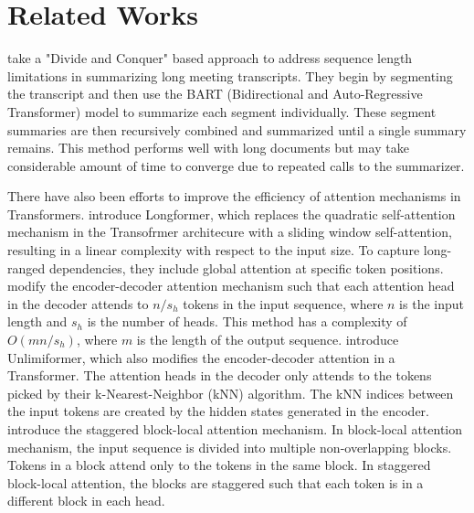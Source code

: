 \section{Related Works}
	\label{sec:related-works}

	\citet{golia2024action} take a "Divide and Conquer" based approach to address
	sequence length limitations in summarizing long meeting transcripts.
	They begin by segmenting the transcript and then use the BART (Bidirectional and
	Auto-Regressive Transformer) model to summarize each segment individually.
	These segment summaries are then recursively combined and summarized until a single
	summary remains.
	This method performs well with long documents but may take considerable amount of time
	to converge due to repeated calls to the summarizer.

	There have also been efforts to improve the efficiency of attention mechanisms in Transformers.
	\citet{beltagy2020longformer} introduce Longformer, which replaces the quadratic
	self-attention mechanism in the Transofrmer architecure with a sliding window self-attention,
	resulting in a linear complexity with respect to the input size.
	To capture long-ranged dependencies, they include global attention at specific token positions.
	\citet{huang-etal-2021-efficient} modify the encoder-decoder attention mechanism such that
	each attention head in the decoder attends to $n/s_h$ tokens in the input sequence, where
	$n$ is the input length and $s_h$ is the number of heads.
	This method has a complexity of $O(mn/s_h)$, where $m$ is the length of the output sequence.
	\citet{bertsch2023unlimiformer} introduce Unlimiformer, which also modifies the encoder-decoder
	attention in a Transformer.
	The attention heads in the decoder only attends to the tokens picked by their
	k-Nearest-Neighbor (kNN) algorithm.
	The kNN indices between the input tokens are created by the hidden states generated in the
	encoder.
	\citet{phang2022investigating} introduce the staggered block-local attention mechanism.
	In block-local attention mechanism, the input sequence is divided into multiple
	non-overlapping blocks.
	Tokens in a block attend only to the tokens in the same block.
	In staggered block-local attention, the blocks are staggered such that each token is in a
	different block in each head.


